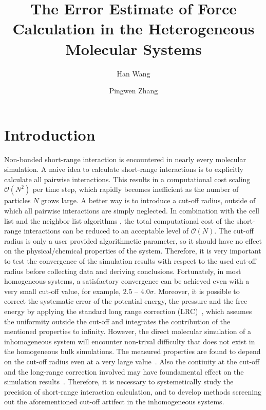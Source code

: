 \documentclass[aps,pre,preprint]{revtex4}
\begin{document}
\title{The Error Estimate of Force Calculation in the Heterogeneous Molecular Systems}
\author{Han Wang}
\author{Pingwen Zhang}

\begin{abstract}
\end{abstract}

\maketitle

\section{Introduction}
Non-bonded short-range interaction is encountered in nearly every
molecular simulation.  A naive idea to calculate short-range
interactions is to explicitly calculate all pairwise
interactions. This results in a computational cost scaling $\mathcal
O(N^2)$ per time step, which rapidly becomes inefficient as the number
of particles $N$ grows large. A better way is to introduce a cut-off
radius, outside of which all pairwise interactions are simply
neglected. In combination with the cell list and the neighbor list
algorithms \cite{frenkel02b}, the total computational cost of the
short-range interactions can be reduced to an acceptable level of
$\mathcal O(N)$. The cut-off radius is only a user provided
algorithmetic parameter, so it should have no effect on the
physical/chemical properties of the system.  Therefore, it is very
important to test the convergence of the simulation results with
respect to the used cut-off radius before collecting data and deriving
conclusions. Fortunately, in most homogeneous systems, a satisfactory
convergence can be achieved even with a very small cut-off value, for
example, $2.5$ -- $4.0\sigma$.  Moreover, it is possible to correct
the systematic error of the potential energy, the pressure and the
free energy by applying the standard long range correction
(LRC)~\cite{allen87a}, which assumes the uniformity outside the
cut-off and integrates the contribution of the mentioned properties to
infinity.  However,
the direct molecular simulation of a inhomogeneous system will
encounter non-trival difficulty that does not exist in the homogeneous
bulk simulations.  The measured properties are found to depend on the
cut-off radius even at a very large value~\cite{duque2004some}. Also
the contiuity at the cut-off and the long-range correction involved
may have foundamental effect on the simulation
results~\cite{trokhymchuk1999computer, shen2007comparative,
  guo1997long, mecke1997molecular, janecek2006long, goujon2004monte}.
Therefore, it is necessary to systemetically study the precision of
short-range interaction calculation, and to develop methods screening
out the aforementioned cut-off artifect in the inhomogeneous systems.
\end{document}
